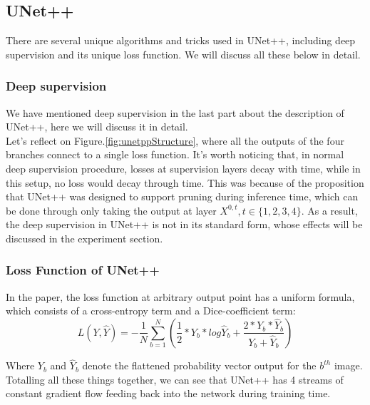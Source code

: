 \subsection{UNet++}
There are several unique algorithms and tricks used in UNet++, including deep supervision and its unique loss function. We will discuss all these below in detail.
\subsubsection{Deep supervision}
We have mentioned deep supervision in the last part about the description of UNet++, here we will discuss it in detail.\\
Let's reflect on Figure.\ref{fig:unetppStructure}, where all the outputs of the four branches connect to a single loss function. It's worth noticing that, in normal deep supervision procedure, losses at supervision layers decay with time, while in this setup, no loss would decay through time. This was because of the proposition that UNet++ was designed to support pruning during inference time, which can be done through only taking the output at layer $X^{0,t}, t\in \{1,2,3,4\}$. As a result, the deep supervision in UNet++ is not in its standard form, whose effects will be discussed in the experiment section.\\
\subsubsection{Loss Function of UNet++}
In the paper\cite{unet_pp}, the loss function at arbitrary output point has a uniform formula, which consists of a cross-entropy term and a Dice-coefficient term:
\begin{equation}
    \displaystyle L(Y, \hat Y)=-\frac{1}{N}\sum_{b=1}^{N}(\frac12 * Y_b * log\hat Y_b + \frac{2* Y_b*\hat Y_b}{Y_b + \hat Y_b})
\end{equation}

Where $Y_b$ and $\hat Y_b$ denote the flattened probability vector output for the $b^{th}$ image.\\

Totalling all these things together, we can see that UNet++ has 4 streams of constant gradient flow feeding back into the network during training time.
